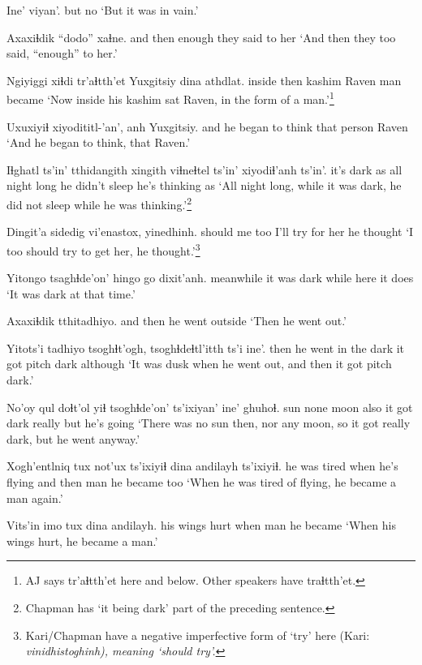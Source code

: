 \documentclass[12pt]{article}
\begin{document}
\gll Ine' viyan'.
but no
\glt `But it was in vain.'
\glend

\gll Axaxiɬdik ``dodo'' xaɬne.
{and then} enough  {they said to her}
\glt `And then they too said, ``enough'' to her.'
\glend

\gll Ngiyiggi xiɬdi tr'aɬtth'et Yuxgitsiy dina athdlat.
inside  then kashim  Raven  man became
\glt `Now inside his kashim sat Raven, in the form of a man.'\footnote{AJ says tr'aɬtth'et here and below. Other speakers have traɬtth'et.}
\glend

\gll Uxuxiyiɬ xiyodititl-'an', anh Yuxgitsiy.
and  {he began to think} {that person} Raven
\glt `And he began to think, that Raven.'
\glend

\gll Iɬghatl ts'in' tthidangith xingith {viɬneɬtel ts'in'} {xiyodiɬ'anh} ts'in'. 
{it's dark} as {all night} long  {he didn't sleep} {he's thinking} as
\glt `All night long, while it was dark, he did not sleep while he was thinking.'\footnote{Chapman has `it being dark' part of the preceding sentence.}
\glend

\gll Dingit'a sidedig vi'enastox, yinedhinh.
should  {me too}  {I'll try for her} {he thought}
\glt `I too should try to get her, he thought.'\footnote{Kari/Chapman have a negative imperfective form of `try' here (Kari: \em vinidhistoghinh), meaning `should try'.}
\glend

\gll Yitongo {tsaghɬde'on'} hingo go dixit'anh.
meanwhile {it was dark} while here {it does}
\glt `It was dark at that time.'
\glend

\gll Axaxiɬdik tthitadhiyo.
{and then} {he went outside}
\glt `Then he went out.'
\glend

\gll Yitots'i tadhiyo tsoghɬt'ogh, tsoghɬdeɬtl'itth ts'i ine'.
then  {he went} {in the dark} {it got pitch dark} {} although
\glt `It was dusk when he went out, and then it got pitch dark.'
\glend

\gll No'oy qul doɬt'ol yiɬ tsoghɬde'on' ts'ixiyan' ine' ghuhoɬ.
sun none moon also {it got dark} really  but {he's going}
\glt `There was no sun then, nor any moon, so it got really dark, but he went anyway.'
\glend

\gll Xogh'entlniq tux not'ux  ts'ixiyiɬ dina andilayh ts'ixiyiɬ.
{he was tired} when {he's flying} {and then} man {he became} too
\glt `When he was tired of flying, he became a man again.'
\glend

\gll Vits'in  imo tux dina andilayh.
{his wings} hurt when man {he became}
\glt `When his wings hurt, he became a man.'
\glend
\end{document}
